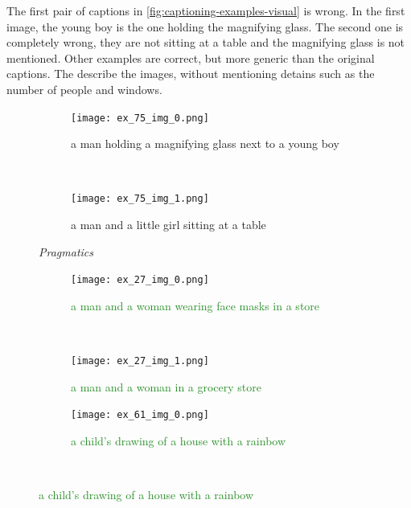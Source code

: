 The first pair of captions in \cref{fig:captioning-examples-visual} is wrong. In the first image, the young boy is the one holding the magnifying glass. The second one is completely wrong, they are not sitting at a table and the magnifying glass is not mentioned. Other examples are correct, but more generic than the original captions. The describe the images, without mentioning detains such as the number of people and windows.

\begin{figure}[ht]
\centering
    \begin{minipage}{.30\textwidth}
        \begin{subfigure}{\textwidth}
        \centering
        \texttt{[image: ex\_75\_img\_0.png]}
        \caption{\textcolor{BrickRed}{a man holding a magnifying glass next to a young boy \xmark}}
        \end{subfigure}\\
        \begin{subfigure}{\textwidth}
        \centering
        \texttt{[image: ex\_75\_img\_1.png]}
        \caption{\textcolor{BrickRed}{a man and a little girl sitting at a table \xmark}}
        \end{subfigure}%
        \caption*{\textit{Pragmatics}}
    \end{minipage}
    \hfill
    \begin{minipage}{.30\textwidth}
        \begin{subfigure}{\textwidth}
        \centering
        \texttt{[image: ex\_27\_img\_0.png]}
        \caption{\textcolor{ForestGreen}{a man and a woman wearing face masks in a store \cmark}}
        \end{subfigure}\\
        \begin{subfigure}{\textwidth}
        \centering
        \texttt{[image: ex\_27\_img\_1.png]}
        \caption{\textcolor{ForestGreen}{a man and a woman in a grocery store \cmark}}
        \end{subfigure}%
        \caption*{\textit{Series}}
    \end{minipage}
    \hfill
    \begin{minipage}{.30\textwidth}
        \begin{subfigure}{\textwidth}
        \centering
        \texttt{[image: ex\_61\_img\_0.png]}
        \caption{\textcolor{ForestGreen}{a child's drawing of a house with a rainbow \cmark}}
        \end{subfigure}\\

\end{minipage}
\end{figure}
